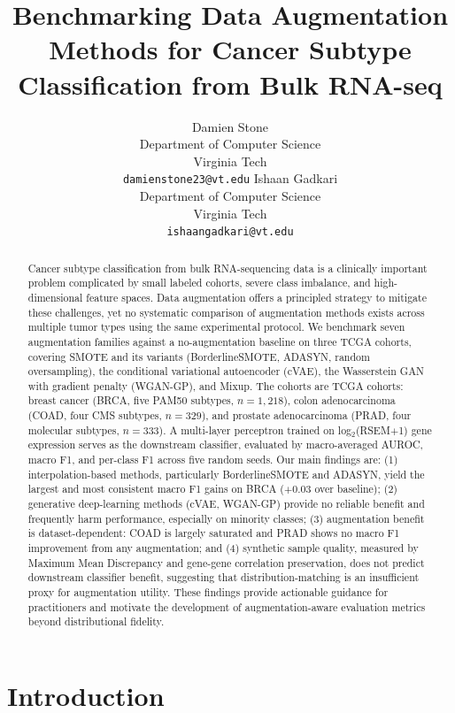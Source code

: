 \documentclass{article}
\title{Benchmarking Data Augmentation Methods for Cancer Subtype Classification from Bulk RNA-seq}
\author{%
  Damien Stone \\
  Department of Computer Science \\
  Virginia Tech \\
  \texttt{damienstone23@vt.edu}
  \And
  Ishaan Gadkari \\
  Department of Computer Science \\
  Virginia Tech \\
  \texttt{ishaangadkari@vt.edu}
}
\begin{document}
\maketitle

\begin{abstract}
Cancer subtype classification from bulk RNA-sequencing data is a clinically important problem
complicated by small labeled cohorts, severe class imbalance, and high-dimensional feature spaces.
Data augmentation offers a principled strategy to mitigate these challenges, yet no systematic
comparison of augmentation methods exists across multiple tumor types using the same experimental
protocol. We benchmark seven augmentation families against a no-augmentation baseline on three
TCGA cohorts, covering SMOTE and its variants (BorderlineSMOTE, ADASYN, random oversampling),
the conditional variational autoencoder (cVAE), the Wasserstein GAN with gradient penalty
(WGAN-GP), and Mixup. The cohorts are
TCGA cohorts: breast cancer (BRCA, five PAM50 subtypes, $n=1{,}218$), colon adenocarcinoma
(COAD, four CMS subtypes, $n=329$), and prostate adenocarcinoma (PRAD, four molecular subtypes,
$n=333$). A multi-layer perceptron trained on log$_2$(RSEM$+$1) gene expression serves as the
downstream classifier, evaluated by macro-averaged AUROC, macro F1, and per-class F1 across
five random seeds. Our main findings are: (1) interpolation-based methods, particularly
BorderlineSMOTE and ADASYN, yield the largest and most consistent macro F1 gains on BRCA
($+0.03$ over baseline); (2) generative deep-learning methods (cVAE, WGAN-GP) provide no
reliable benefit and frequently harm performance, especially on minority classes; (3) augmentation
benefit is dataset-dependent: COAD is largely saturated and PRAD shows no macro F1 improvement
from any augmentation; and (4) synthetic sample quality, measured by Maximum Mean Discrepancy and
gene-gene correlation preservation, does not predict downstream classifier benefit, suggesting that
distribution-matching is an insufficient proxy for augmentation utility. These findings provide
actionable guidance for practitioners and motivate the development of augmentation-aware evaluation
metrics beyond distributional fidelity.
\end{abstract}

\section{Introduction}
\end{document}
